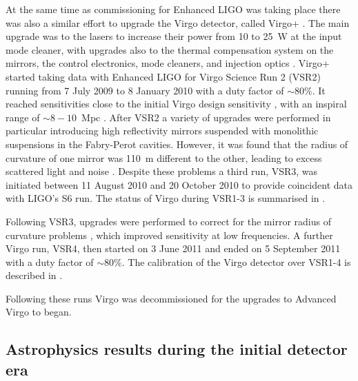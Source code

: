 At the same time as commissioning for Enhanced LIGO was taking place there was also a similar effort to 
upgrade the Virgo detector, called Virgo+ \cite{2011CQGra..28k4002A}. The main upgrade was to the lasers to 
increase their power from 10 to 25~W at the input mode cleaner, with upgrades also to the thermal compensation 
system on the mirrors, the control electronics, mode cleaners, and injection optics \cite{Acernese:2008b, 
AdvVirgoWhitepaper}. Virgo+ started taking data with Enhanced LIGO for Virgo Science Run 2 (VSR2) running from 
7 July 2009 to 8 January 2010 with a duty factor of $\sim 80\%$. It reached sensitivities close to the initial 
Virgo design sensitivity \cite{2012JInst...7.3012A}, with an inspiral range of $\sim 8-10$~Mpc 
\cite{VSR2paper}. After VSR2 a variety of upgrades were performed in particular introducing high reflectivity 
mirrors suspended with monolithic suspensions in the Fabry-Perot cavities. However, it was found that the 
radius of curvature of one mirror was 110~m different to the other, leading to excess scattered light and 
noise \cite{VSR2paper}. Despite these problems a third run, VSR3, was initiated between 11 August 2010 
and 20 October 2010 to provide coincident data with LIGO's S6 run. The status of Virgo during VSR1-3 is 
summarised in \cite{2012CQGra..29o5002A}.

Following VSR3, upgrades were performed to correct for the mirror radius of curvature problems 
\cite{VSR2paper}, which improved sensitivity at low frequencies. A further Virgo run, VSR4, then started on 3 
June 2011 and ended on 5 September 2011 with a duty factor of $\sim 80\%$. The calibration of the Virgo 
detector over VSR1-4 is described in \cite{2014CQGra..31p5013A}.

Following these runs Virgo was decommissioned for the upgrades to Advanced Virgo to began. 

\subsection{Astrophysics results during the initial detector era}
\label{subsection:results}


